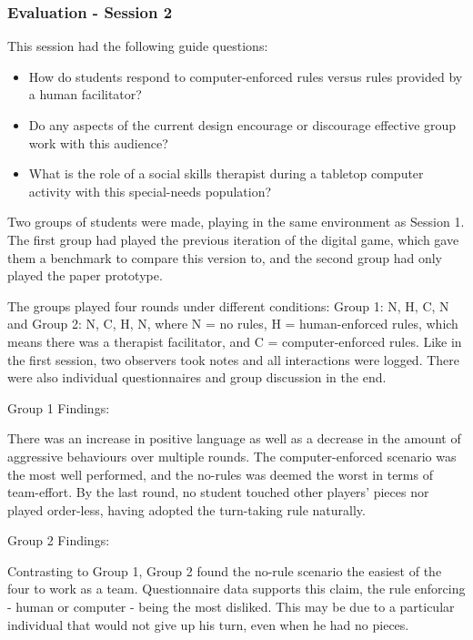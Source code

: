 \documentclass[runningheads]{llncs}
\begin{document}
\subsubsection{Evaluation - Session 2}
\par This session had the following guide questions:
\begin{itemize}
    \item How do students respond to computer-enforced rules versus rules provided by a human facilitator?
    \item Do any aspects of the current design encourage or discourage effective group work with this audience?
    \item What is the role of a social skills therapist during a tabletop computer activity with this special-needs population? 
\end{itemize}
\par Two groups of students were made, playing in the same environment as Session 1. The first group had played the previous iteration of the digital game, which gave them a benchmark to compare this version to, and the second group had only played the paper prototype.
\par The groups played four rounds under different conditions: Group 1: N, H, C, N and Group 2: N, C, H, N, where N = no rules, H = human-enforced rules, which means there was a therapist facilitator, and C = computer-enforced rules. Like in the first session, two observers took notes and all interactions were logged. There were also individual questionnaires and group discussion in the end.
\medskip
\par Group 1 Findings:
\par There was an increase in positive language as well as a decrease in the amount of aggressive behaviours over multiple rounds. The computer-enforced scenario was the most well performed, and the no-rules was deemed the worst in terms of team-effort. By the last round, no student touched other players' pieces nor played order-less, having adopted the turn-taking rule naturally.
\medskip
\par Group 2 Findings:
\par Contrasting to Group 1, Group 2 found the no-rule scenario the easiest of the four to work as a team. Questionnaire data supports this claim, the rule enforcing - human or computer - being the most disliked. This may be due to a particular individual that would not give up his turn, even when he had no pieces.
\end{document}
